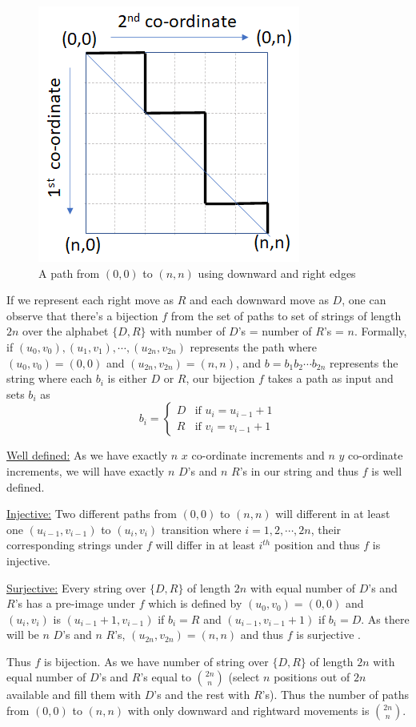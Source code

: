 \begin{figure}[h!]
    \centering
    \includegraphics[width=0.4\linewidth]{sample-path.png}
    \caption{A path from $(0,0)$ to $(n,n)$ using downward and right edges}
    \label{fig:sample-path}
\end{figure}

If we represent each right move as $R$ and each downward move as $D$, one can observe that there's a bijection $f$ from the set of paths to set of strings of length $2n$ over the alphabet $\{D,R\}$ with number of $D$'s = number of $R$'s = $n$. Formally, if $(u_0,v_0), (u_1,v_1),\cdots,(u_{2n},v_{2n})$ represents the path where $(u_0,v_0)=(0,0)$ and $(u_{2n},v_{2n})=(n,n)$, and $b=b_1b_2\cdots b_{2n}$ represents the string where each $b_i$ is either $D$ or $R$, our bijection $f$ takes a path as input and sets $b_i$ as
$$b_i=\begin{cases}
D &\mbox{if } u_i = u_{i-1}+1\\
R &\mbox{if } v_i = v_{i-1}+1
\end{cases}$$
\begin{description}
\item \underline{Well defined:} As we have exactly $n$ $x$ co-ordinate increments and $n$ $y$ co-ordinate increments, we will have exactly $n$ $D$'s and $n$ $R$'s in our string and thus $f$ is well defined.
\item \underline{Injective:} Two different paths from $(0,0)$ to $(n,n)$ will different in at least one $(u_{i-1},v_{i-1})$ to $(u_i,v_i)$ transition where $i=1,2,\cdots,2n$, their corresponding strings under $f$ will differ in at least $i^{th}$ position and thus $f$ is injective.
\item \underline{Surjective:} Every string over $\{D,R\}$ of length $2n$ with equal number of $D$'s and $R$'s has a pre-image under $f$ which is defined by $(u_0,v_0)=(0,0)$ and $(u_i,v_i)$ is $(u_{i-1}+1,v_{i-1})$ if $b_i=R$ and $(u_{i-1},v_{i-1}+1)$ if $b_i=D$. As there will be $n$ $D$'s and $n$ $R$'s, $(u_{2n},v_{2n})=(n,n)$ and thus $f$ is surjective .
\end{description} 
Thus $f$ is bijection. As we have number of string over $\{D,R\}$ of length $2n$ with equal number of $D$'s and $R$'s equal to $\binom{2n}{n}$ (select $n$ positions out of $2n$ available and fill them with $D$'s and the rest with $R$'s). Thus the number of paths from $(0,0)$ to $(n,n)$ with only downward and rightward movements is $\binom{2n}{n}$.

